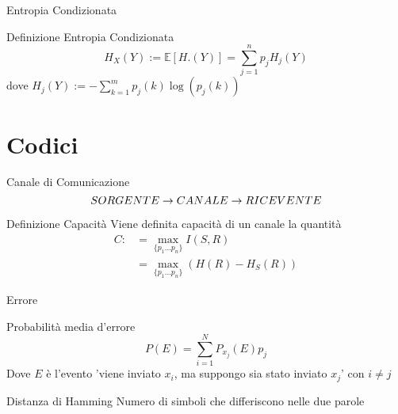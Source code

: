 \documentclass{beamer}
\theoremstyle{definition}
\numberwithin{equation}{section}
\begin{document}
\begin{frame}[t]{Entropia Condizionata} \vspace{5pt}
\begin{block}{Definizione Entropia Condizionata}
\vspace{0.5em}
\begin{equation*}
H_X(Y):= \mathbb{E}[H.(Y)]= \sum_{j=1}^n p_j H_j(Y)
\end{equation*}
dove $H_j(Y):=-\sum_{k=1}^m p_j(k)\log(p_j(k))$
\vspace{0.5em}
\end{block}
\vspace{10pt}
\vspace{20pt}
\end{frame}

\section{Codici}


\begin{frame}[t]{Canale di Comunicazione}
\begin{equation*}
\large{SORGENTE  \to CANALE  \to RICEVENTE}
\end{equation*}

\vspace{30pt}
\begin{block}{Definizione Capacità}
Viene definita capacità di un canale la quantità
\[
\begin{split}
C:&=\max_{\{ p_1...p_n \}} I(S,R) \\
&=\max_{\{ p_1...p_n \}}(H(R)-H_S(R))
\end{split}
\]
\end{block}

\end{frame}



\begin{frame}[t]{Errore} \vspace{20pt}
\begin{block}{Probabilità media d'errore}
$$P(E)=\sum_{i=1}^N P_{x_j}(E)p_j$$
Dove $E$ è l'evento 'viene inviato $x_i$, ma suppongo sia stato inviato $x_j$' con $i\neq j$
\end{block}
\vspace{30pt}
\begin{block}{Distanza di Hamming}
\vspace{0.5em}
Numero di simboli che differiscono nelle due parole
\vspace{0.5em}
\end{block}
\vspace{20pt}
\end{frame}
\end{document}
